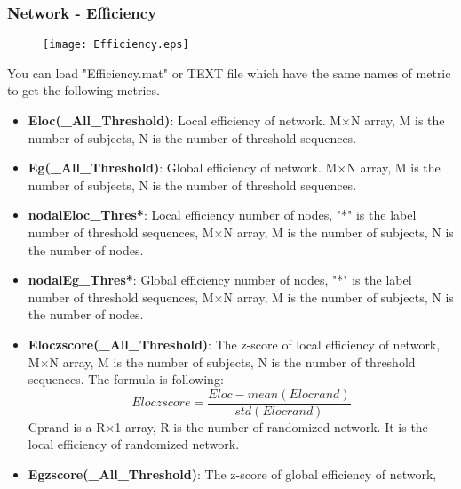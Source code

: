 \documentclass[11pt]{article}
\begin{document}
			\subsubsection{Network - Efficiency}
				\begin{figure}
					\begin{center}
						\texttt{[image: Efficiency.eps]}
					\end{center}
				\end{figure}
				You can load "Efficiency.mat" or TEXT file which have the same names of metric to get the following metrics.
				\begin{itemize}
					\item \textbf{Eloc(\_All\_Threshold)}: Local efficiency of network.
						M$\times$N array, M is the number of subjects, N is the number of threshold sequences.
					\item \textbf{Eg(\_All\_Threshold)}: Global efficiency of network.
						M$\times$N array, M is the number of subjects, N is the number of threshold sequences.
					\item \textbf{nodalEloc\_Thres*}: Local efficiency number of nodes, "*" is the label number of threshold sequences,
						M$\times$N array, M is the number of subjects, N is the number of nodes.
					\item \textbf{nodalEg\_Thres*}: Global efficiency number of nodes, "*" is the label number of threshold sequences,
						M$\times$N array, M is the number of subjects, N is the number of nodes.
					\item \textbf{Eloczscore(\_All\_Threshold)}: The z-score of local efficiency of network, 
						M$\times$N array, M is the number of subjects, N is the number of threshold sequences.
						The formula is following:
						$$Eloczscore=\frac{Eloc-mean(Elocrand)}{std(Elocrand)}$$
						Cprand is a R$\times$1 array, R is the number of randomized network. 
						It is the local efficiency of randomized network.
					\item \textbf{Egzscore(\_All\_Threshold)}: The z-score of global efficiency of network,

\end{itemize}
\end{document}
